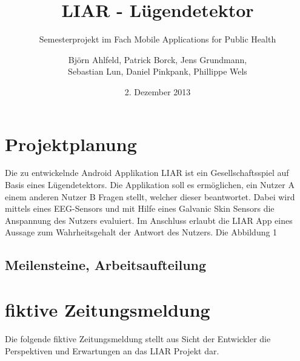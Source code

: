 \documentclass[10pt, a4paper, oneside, titlepage]{scrartcl} %
\date{2. Dezember 2013}
\author{Björn Ahlfeld, Patrick Borck, Jens Grundmann,\\ Sebastian Lun, Daniel Pinkpank, Phillippe Wels}
\title{LIAR - Lügendetektor}
\subtitle{Semesterprojekt im Fach Mobile Applications for Public Health}
\begin{document}
   	\maketitle
   	\thispagestyle{empty}
	\tableofcontents
	\listoffigures
	\listoftables
	
   	\newpage   	
   	\section{Projektplanung}
   	Die zu entwickelnde Android Applikation LIAR ist ein Gesellschaftsspiel auf Basis eines Lügendetektors. Die Applikation soll es ermöglichen, ein Nutzer A einem anderen Nutzer B Fragen stellt, welcher dieser beantwortet. Dabei wird mittels eines EEG-Sensors und mit Hilfe eines Galvanic Skin Sensors die Anspannung des Nutzers evaluiert. Im Anschluss erlaubt die LIAR App eines Aussage zum Wahrheitsgehalt der Antwort des Nutzers. Die Abbildung 1 
   	
   	\newpage
   	\subsection{Meilensteine, Arbeitsaufteilung}
   	

	\newpage
   	\section{fiktive Zeitungsmeldung}
   	Die folgende fiktive Zeitungsmeldung stellt aus Sicht der Entwickler die Perspektiven und Erwartungen an das LIAR Projekt dar. 
	   
\end{document}
